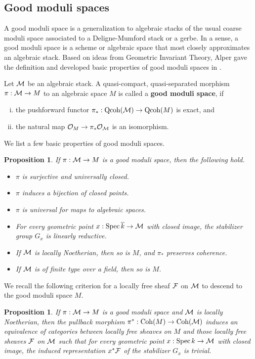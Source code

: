 \documentclass[letterpaper,12pt]{amsart}
\newtheorem{prop}[thm]{Proposition}
\theoremstyle{remark}
\begin{document}
\subsection{Good moduli spaces}
A good moduli space is a generalization to algebraic stacks of the usual coarse moduli space associated to a Deligne-Mumford stack or a gerbe. In a sense, a good moduli space is a scheme or algebraic space that most closely approximates an algebraic stack. Based on ideas from Geometric Invariant Theory, Alper gave the definition and developed basic properties of good moduli spaces in \cite{AlperGMS}.

Let $\mathcal{M}$ be an algebraic stack. A quasi-compact, quasi-separated morphism $\pi: \mathcal{M} \to M$ to an algebraic space $M$ is called a {\bf good moduli space}, if 
\begin{enumerate}[(i)]
    \item the pushforward functor $\pi_*: \mathrm{Qcoh}(\mathcal{M}) \to \mathrm{Qcoh}(M)$ is exact, and
    \item the natural map $\mathcal{O}_M \to \pi_*\mathcal{O}_{\mathcal{M}}$ is an isomorphism.
\end{enumerate}
We list a few basic properties of good moduli spaces.
\begin{prop}
    If $\pi: \mathcal{M} \to M$ is a good moduli space, then the following hold. \begin{itemize}
        \item $\pi$ is surjective and universally closed.
        \item $\pi$ induces a bijection of closed points.
        \item $\pi$ is universal for maps to algebraic spaces.
        \item For every geometric point $x: \operatorname{\mathrm{Spec}} \overline{k} \to \mathcal{M}$ with closed image, the stabilizer group $G_x$ is linearly reductive.
        \item If $\mathcal{M}$ is locally Noetherian, then so is $M$, and $\pi_*$ preserves coherence.
        \item If $\mathcal{M}$ is of finite type over a field, then so is $M$.
    \end{itemize}
\end{prop}

We recall the following criterion \cite[Theorem 10.3]{AlperGMS} for a locally free sheaf $\mathcal{F}$ on $\mathcal{M}$ to descend to the good moduli space $M$. 
\begin{prop}\label{vbtogms}
    If $\pi: \mathcal{M} \to M$ is a good moduli space and $\mathcal{M}$ is locally Noetherian, then the pullback morphism $\pi^*: \mathrm{Coh}(M) \to \mathrm{Coh}(\mathcal{M})$ induces an equivalence of categories between locally free sheaves on $M$ and those locally free sheaves $\mathcal{F}$ on $\mathcal{M}$ such that for every geometric point $x: \operatorname{\mathrm{Spec}} k \to \mathcal{M}$ with closed image, the induced representation $x^*\mathcal{F}$ of the stabilizer $G_x$ is trivial.
\end{prop}
\end{document}
